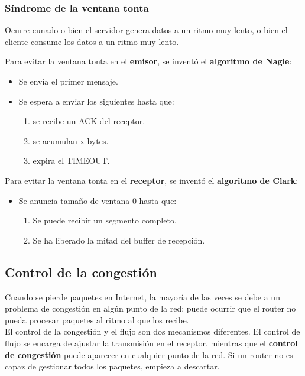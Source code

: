 \subsubsection{Síndrome de la ventana tonta}
Ocurre cunado o bien el servidor genera datos a un ritmo muy lento, o bien el cliente consume los datos a un ritmo muy lento.\\
\begin{tcolorbox}[colback=white]
Para evitar la ventana tonta en el \textbf{emisor}, se inventó el \textbf{algoritmo de Nagle}:
\begin{itemize}
    \item Se envía el primer mensaje.
    \item Se espera a enviar los siguientes hasta que:
    \begin{enumerate}
        \item se recibe un ACK del receptor.
        \item se acumulan x bytes.
        \item expira el TIMEOUT.
    \end{enumerate}
\end{itemize}
\end{tcolorbox}
\begin{tcolorbox}[colback=white]
Para evitar la ventana tonta en el \textbf{receptor}, se inventó el \textbf{algoritmo de Clark}:
\begin{itemize}
    \item Se anuncia tamaño de ventana 0 hasta que:
    \begin{enumerate}
        \item Se puede recibir un segmento completo.
        \item Se ha liberado la mitad del buffer de recepción.
    \end{enumerate}
\end{itemize}
\end{tcolorbox}


\subsection{Control de la congestión}
Cuando se pierde paquetes en Internet, la mayoría de las veces se debe a un problema de congestión en algún punto de la red: puede ocurrir que el router no pueda procesar paquetes al ritmo al que los recibe.\\

El control de la congestión y el flujo son dos mecanismos diferentes. El control de flujo se encarga de ajustar la transmisión en el receptor, mientras que el \textbf{control de congestión} puede aparecer en cualquier punto de la red. Si un router no es capaz de gestionar todos los paquetes, empieza a descartar.\\

